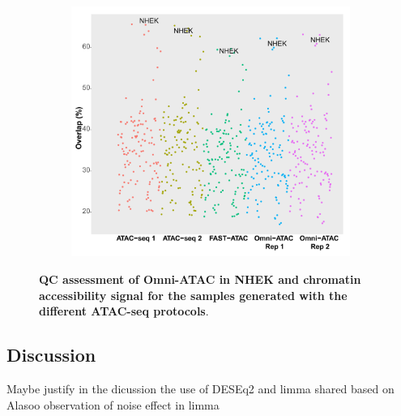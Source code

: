 \begin{figure}[htbp]
\begin{subfigure}{0.5\textwidth}
\caption{\textbf{}}
\end{subfigure}
\begin{subfigure}{0.5\textwidth}
\centering
\includegraphics[width=\textwidth]{./Results1/pdfs/ENCODE_125_cell_types_overlap_FAST_ATAC_Omni_ATAC_qval_2}
\caption{\textbf{}} %
\end{subfigure}%
\caption[QC assessment of Omni-ATAC in NHEK and chromatin accessibility signal for the samples generated with the different ATAC-seq protocols]{\textbf{QC assessment of Omni-ATAC in NHEK and chromatin accessibility signal for the samples generated with the different ATAC-seq protocols}.\\}
\label{fig:Omni_ATAC_NHEK_QC_assessment_and_all_tracks}
\end{figure} 



\subsection{Discussion}
Maybe justify in the dicussion the use of DESEq2 and limma shared based on Alasoo observation of noise effect in limma